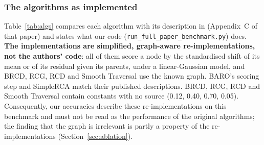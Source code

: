 \documentclass[11pt]{article}
\begin{document}
\subsubsection{The algorithms as implemented}
Table~\ref{tab:algs} compares each algorithm with its description in \citet{lee2026brcd} (Appendix~C of that paper) and states what our code (\texttt{run\_full\_paper\_benchmark.py}) does. \textbf{The implementations are simplified, graph-aware re-implementations, not the authors' code}: all of them score a node by the standardised shift of its mean or of its residual given its parents, under a linear-Gaussian model, and BRCD, RCG, RCD and Smooth Traversal use the known graph. BARO's scoring step and SimpleRCA match their published descriptions. BRCD, RCG, RCD and Smooth Traversal contain constants with no source (0.12, 0.40, 0.70, 0.05). Consequently, our accuracies describe these re-implementations on this benchmark and must not be read as the performance of the original algorithms; the finding that the graph is irrelevant is partly a property of the re-implementations (Section~\ref{sec:ablation}).
\end{document}
